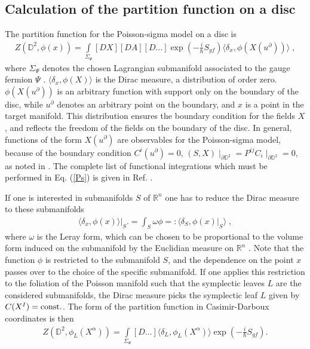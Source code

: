 \documentclass[a4paper,twoside,11pt]{article}
\numberwithin{equation}{section}
\begin{document}
\subsection{Calculation of the partition function on a disc}
%
The partition function for the Poisson-sigma model on a disc is 
\begin{gather}
Z(\mathbb{D}^2,\phi(x))=\int\limits_{\Sigma_\Psi}[DX][DA][D\ldots]\exp(-\frac{i}{\hbar}S_{gf})
\langle\delta_x,\phi(X(u^\partial))\rangle\;,
\label{Ps}
\end{gather}
where $\Sigma_\Psi$ denotes the chosen Lagrangian submanifold associated to the gauge fermion $\Psi$ 
\cite{HS}. $\langle\delta_x,\phi(X)\rangle$ is the Dirac measure, a distribution of order zero. 
$\phi(X(u^\partial))$ is an arbitrary function with support only on the boundary of the disc, 
while $u^\partial$ denotes an arbitrary point on the boundary, and $x$ is a point in the target manifold. 
This distribution ensures the boundary condition for the fields $X$, and reflects the freedom of the fields 
on the boundary of the disc. In general, functions of the 
form $X(u^\partial)$ are observables for the Poisson-sigma model, because of the boundary condition 
$C^i(u^\partial)=0$, $(S,X)\mid_{\partial\mathbb{D}^2}=P^{ij}C_i\mid_{\partial\mathbb{D}^2}=0$, 
as noted in \cite{CF1}.
The complete list of functional integrations which must be performed in Eq. (\ref{Ps}) is given in Ref. \cite{HS}.

If one is interested in submanifolds $S$ of $\mathds{R}^n$ one has to reduce the Dirac measure to 
these submanifolds
\begin{gather}
\langle\delta_x,\phi(x)\rangle\biggl|_S\biggr.=\int_S\omega\phi=:\langle\delta_S,\phi(x)\bigl|_S\rangle\;,
\end{gather}
where $\omega$ is the Leray form, which can be chosen to be proportional to the volume form induced on 
the submanifold by the Euclidian measure on $\mathds{R}^n$ \cite{CD}. Note that the function $\phi$ is restricted 
to the submanifold $S$, and the dependence on the point $x$ passes over to the choice of the specific 
submanifold. If one applies this restriction to the foliation of the Poisson manifold such 
that the symplectic leaves $L$ are the considered submanifolds, the Dirac measure picks the 
symplectic leaf $L$ given by $C(X^I)={\rm const}.$. The form of the partition function in Casimir-Darboux 
coordinates is then
\begin{gather}
Z(\mathbb{D}^2,\phi_L(X^\alpha))=
\int\limits_{\Sigma_\Psi}[D\ldots]\langle\delta_{L},\phi_L(X^\alpha)\rangle
\exp(-\frac{i}{\hbar}S_{gf}).
\end{gather}
\end{document}

